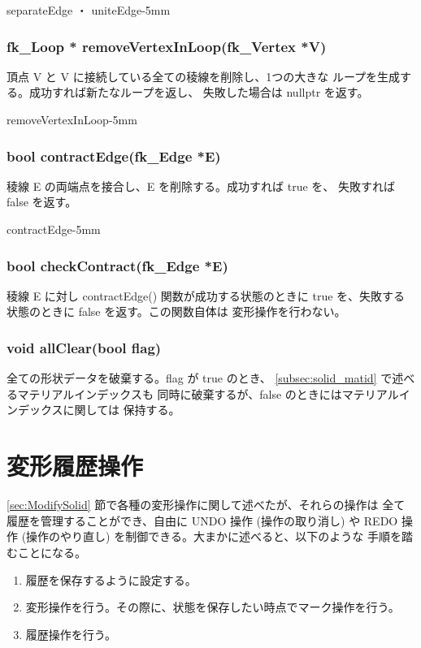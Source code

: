 	{separateEdge ・ uniteEdge}{-5mm}

 \subsubsection*{\hspace*{0.6cm}fk\_Loop * removeVertexInLoop(fk\_Vertex *V)}
	頂点 V と V に接続している全ての稜線を削除し、1つの大きな
	ループを生成する。成功すれば新たなループを返し、
	失敗した場合は nullptr を返す。

	{removeVertexInLoop}{-5mm}

 \subsubsection*{\hspace*{0.6cm}bool contractEdge(fk\_Edge *E)}
	稜線 E の両端点を接合し、E を削除する。成功すれば true を、
	失敗すれば false を返す。

	{contractEdge}{-5mm}

 \subsubsection{\hspace*{0.6cm}bool checkContract(fk\_Edge *E)}
	稜線 E に対し contractEdge() 関数が成功する状態のときに
	true を、失敗する状態のときに false を返す。この関数自体は
	変形操作を行わない。

 \subsubsection{\hspace*{0.6cm}void allClear(bool flag)}
	全ての形状データを破棄する。flag が true のとき、
	\ref{subsec:solid_matid} で述べるマテリアルインデックスも
	同時に破棄するが、false のときにはマテリアルインデックスに関しては
	保持する。

\section{変形履歴操作}
\ref{sec:ModifySolid} 節で各種の変形操作に関して述べたが、それらの操作は
全て履歴を管理することができ、自由に UNDO 操作 (操作の取り消し) や
REDO 操作 (操作のやり直し) を制御できる。大まかに述べると、以下のような
手順を踏むことになる。
\begin{enumerate}
 \item 履歴を保存するように設定する。
 \item 変形操作を行う。その際に、状態を保存したい時点でマーク操作を行う。
 \item 履歴操作を行う。
\end{enumerate}

